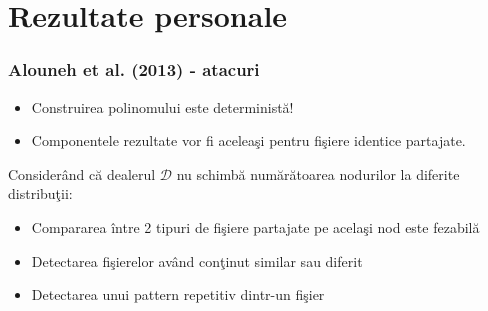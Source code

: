 \documentclass{beamer}
\theoremstyle{definition}
\begin{document}
\section{Rezultate personale}
\begin{frame}
    \frametitle{Alouneh et al. (2013) - atacuri}
     {
        \begin{itemize}
            \item Construirea polinomului este determinist\u{a}!
            \pause
            \item Componentele rezultate vor fi acelea\c{s}i pentru fi\c{s}iere identice partajate.
        \end{itemize}
    }
     {
        Consider\^{a}nd c\u{a} dealerul $\mathcal{D}$ nu schimb\u{a} num\u{a}r\u{a}toarea nodurilor la diferite distribu\c{t}ii:
        \begin{itemize}
            \item Compararea \^{i}ntre 2 tipuri de fi\c{s}iere partajate pe acela\c{s}i nod este fezabil\u{a}
            \pause
            \item Detectarea fi\c{s}ierelor av\^{a}nd con\c{t}inut similar sau diferit
            \pause
            \item Detectarea unui pattern repetitiv dintr-un fi\c{s}ier
        \end{itemize}
    }
\end{frame}
\end{document}
